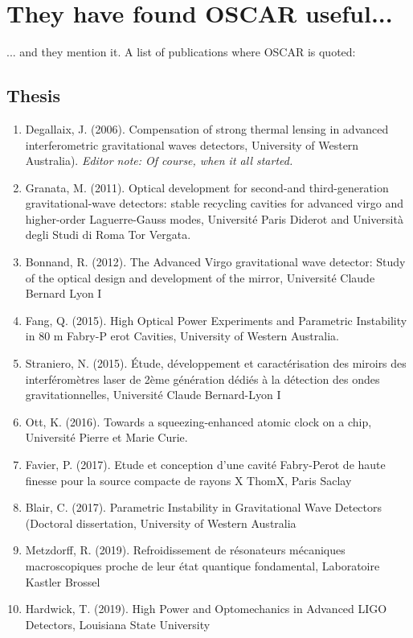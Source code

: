 \chapter{They have found OSCAR useful...}
... and they mention it. A list of publications where OSCAR is quoted:

\section{Thesis}

\begin{enumerate}

\item Degallaix, J. (2006). Compensation of strong thermal lensing in advanced interferometric gravitational waves detectors, University of Western Australia). \emph{Editor note: Of course, when it all started.}

\item Granata, M. (2011). Optical development for second-and third-generation gravitational-wave detectors: stable recycling cavities for advanced virgo and higher-order Laguerre-Gauss modes, Université Paris Diderot and Università degli Studi di Roma Tor Vergata.

\item Bonnand, R. (2012). The Advanced Virgo gravitational wave detector: Study of the optical design and development of the mirror, Université Claude Bernard Lyon I

\item Fang, Q. (2015). High Optical Power Experiments and Parametric Instability in 80 m Fabry-P erot Cavities, University of Western Australia.

\item Straniero, N. (2015). Étude, développement et caractérisation des miroirs des interféromètres laser de 2ème génération dédiés à la détection des ondes gravitationnelles, Université Claude Bernard-Lyon I

\item Ott, K. (2016). Towards a squeezing-enhanced atomic clock on a chip, Université Pierre et Marie Curie.

\item Favier, P. (2017). Etude et conception d'une cavité Fabry-Perot de haute finesse pour la source compacte de rayons X ThomX, Paris Saclay

\item Blair, C. (2017). Parametric Instability in Gravitational Wave Detectors (Doctoral dissertation, University of Western Australia

\item Metzdorff, R. (2019). Refroidissement de résonateurs mécaniques macroscopiques proche de leur état quantique fondamental, Laboratoire Kastler Brossel

\item Hardwick, T. (2019). High Power and Optomechanics in Advanced LIGO Detectors, Louisiana State University 
\end{enumerate}

